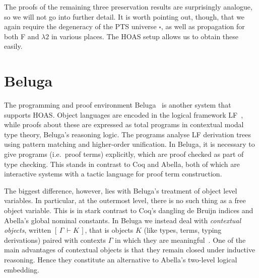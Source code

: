\documentclass[a4paper,UKenglish]{lipics-v2016}
\newcommand{\ms}{\,}
\newcommand{\SysL}{$\lambda2$\xspace}
\newcommand{\Typ}{\ensuremath{\square}}
\theoremstyle{plain}
\begin{document}
The proofs of the remaining three preservation results are surprisingly analogue, so we will not go into further detail.
It is worth pointing out, though, that we again require the degeneracy of the PTS universe $\Typ$, as well as propagation for both F and \SysL in various places.
The HOAS setup allows us to obtain these easily.

\section{Beluga}
\label{sec:beluga}

\newcommand{\D}{\mathcal{D}}
\newcommand{\bc}[2]{\ensuremath{[\,#1\,\vdash #2\,]}}
\newcommand{\sof}{\ensuremath{\!:\ms}}
\newcommand{\ssep}{\ensuremath{,\ms}}

The programming and proof environment Beluga~\cite{Pientka:FLOPS10,Pientka:CADE15} is another system that supports HOAS.
Object languages are encoded in the logical framework LF~\cite{Harper93jacm}, while proofs about these are expressed as total programs in contextual modal type theory, Beluga's reasoning logic.
The programs analyse LF derivation trees using pattern matching and higher-order unification.
In Beluga, it is necessary to give programs (i.e.\ proof terms) explicitly, which are proof checked as part of type checking.
This stands in contrast to Coq and Abella, both of which are interactive systems with a tactic language for proof term construction.


The biggest difference, however, lies with Beluga's treatment of object level variables.
In particular, at the outermost level, there is no such thing as a free object variable.
This is in stark contrast to Coq's dangling de Bruijn indices and Abella's global nominal constants.
In Beluga we instead deal with \emph{contextual objects}, written $\bc{\Gamma}{K}$, that is objects $K$ (like types, terms, typing derivations) paired with contexts $\Gamma$ in which they are meaningful~\cite{Nanevski:ICML05,Pientka:POPL08}.
One of the main advantages of contextual objects is that they remain closed under inductive reasoning.
Hence they constitute an alternative to Abella's two-level logical embedding.
\end{document}
